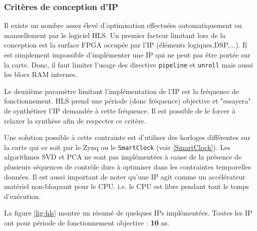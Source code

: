\documentclass[12pt,a4paper]{ieee}
\begin{document}
\subsubsection{Critères de conception d'IP}
Il existe un nombre assez élevé d'optimisation effectuées automatiquement ou manuellement par le logiciel HLS. Un premier facteur limitant lors de la conception est la surface FPGA occupée par l'IP (éléments logiques,DSP,...). Il est simplement impossible d'implémenter une IP qui ne peut pas être portée sur la carte. Donc, il faut limiter l'usage des directive \texttt{pipeline} et \texttt{unroll} mais aussi les blocs RAM internes.

Le deuxième paramètre limitant l'implémentation de l'IP est la fréquence de fonctionnement. HLS prend une période (donc fréquence) objective et "essayera" de synthétiser l'IP demandée à cette fréquence. Il est possible de le forcer à relaxer la synthèse afin de respecter ce critère.

Une solution possible à cette contrainte est d'utiliser des horloges différentes sur la carte qui ce soit par le Zynq ou le \texttt{SmartClock} (voir \ref{SmartClock}). Les algorithmes SVD et PCA ne sont pas implémentées à cause de la présence de plusieurs séquences de contrôle durs à optimiser dans les contraintes temporelles données. Il est aussi important de noter qu'une IP agit comme un accélérateur matériel non-bloquant pour le CPU. i.e. le CPU est libre pendant tout le temps d'exécution.

La figure \ref{fig-hls} montre un résumé de quelques IPs implémentées. Toutes les IP ont pour période de fonctionnement objective : \textbf{10} ns.
\end{document}

